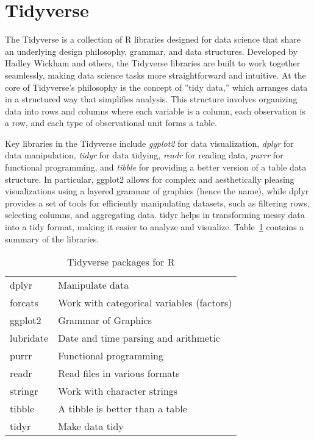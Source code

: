 \section{Tidyverse}

The Tidyverse is a collection of R libraries designed for data science that share an underlying design philosophy, grammar, and data structures. Developed by Hadley Wickham and others, the Tidyverse libraries are built to work together seamlessly, making data science tasks more straightforward and intuitive. At the core of Tidyverse's philosophy is the concept of ''tidy data,'' which arranges data in a structured way that simplifies analysis. This structure involves organizing data into rows and columns where each variable is a column, each observation is a row, and each type of observational unit forms a table.

Key libraries in the Tidyverse include \emph{ggplot2} for data visualization, \emph{dplyr} for data manipulation, \emph{tidyr} for data tidying, \emph{readr} for reading data, \emph{purrr} for functional programming, and \emph{tibble} for providing a better version of a table data structure. In particular, ggplot2 allows for complex and aesthetically pleasing visualizations using a layered grammar of graphics (hence the name), while dplyr provides a set of tools for efficiently manipulating datasets, such as filtering rows, selecting columns, and aggregating data. tidyr helps in transforming messy data into a tidy format, making it easier to analyze and visualize. Table~\ref{tab:tidyverse} contains a summary of the libraries.

\begin{table}
\centering

\renewcommand{\arraystretch}{1.25}
\begin{tabular}{l|l} \hline
dplyr & Manipulate data \\
forcats & Work with categorical variables (factors) \\
ggplot2 & Grammar of Graphics \\
lubridate & Date and time parsing and arithmetic \\
purrr & Functional programming \\
readr & Read files in various formats \\
stringr & Work with character strings \\
tibble & A tibble is better than a table \\
tidyr & Make data tidy \\ \hline
\end{tabular}
\caption{Tidyverse packages for R}
\label{tab:tidyverse}
\end{table}

